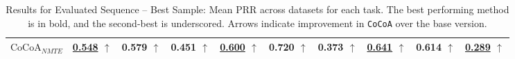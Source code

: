\begin{table*}[th!]
\begin{tabular}{lccccccccc}
$\text{CoCoA}_{NMTE}$ & \underline{0.548}  \(\uparrow\)   & 0.579  \(\uparrow\)   & 0.451  \(\uparrow\)   & \underline{0.600}  \(\uparrow\)   & 0.720  \(\uparrow\)   & \textbf{0.373}  \(\uparrow\)   & \underline{0.641}  \(\uparrow\)   & 0.614  \(\uparrow\)   & \underline{0.289}  \(\uparrow\)   \\
    \bottomrule
    \end{tabular}%
    \caption{Results for Evaluated Sequence -- Best Sample: Mean PRR across datasets for each task. The best performing method is in bold, and the second-best is underscored. Arrows indicate improvement in \texttt{CoCoA} over the base version.}
    \label{tab:best_sample_results}
    \end{table*}    

    